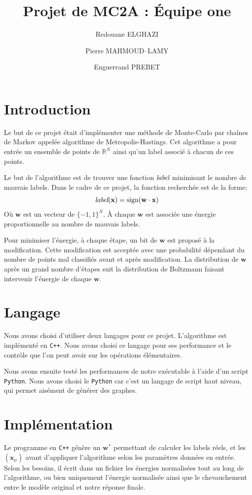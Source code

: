 \documentclass[twocolumn]{article}
\date{}
\author{Redouane ELGHAZI \and Pierre MAHMOUD--LAMY \and Enguerrand PREBET}
\title{Projet de MC2A : Équipe one}
\begin{document}
	\maketitle
	\section{Introduction}
		Le but de ce projet était d'implémenter une méthode de Monte-Carlo par chaînes de Markov appelée algorithme de Metropolis-Hastings. Cet algorithme a pour entrée un ensemble de points de $\mathbb{R}^N$ ainsi qu'un label associé à chacun de ces points.
		
		Le but de l'algorithme est de trouver une fonction $\emph{label}$ minimisant le nombre de mauvais labels. Dans le cadre de ce projet, la fonction recherchée est de la forme:
		$$\emph{label}(\mathbf{x}) = \text{sign}(\mathbf{w}\cdot \mathbf{x})$$
		Où $\mathbf{w}$ est un vecteur de $\big\{{-1},1\big\}^N$. À chaque $\mathbf{w}$ est associée une énergie proportionnelle au nombre de mauvais labels.
		
		Pour minimiser l'énergie, à chaque étape, un bit de $\mathbf{w}$ est proposé à la modification. Cette modification est acceptée avec une probabilité dépendant du nombre de points mal classifiés avant et après modification. La distribution de $\mathbf{w}$ après un grand nombre d'étapes suit la distribution de Boltzmann faisant intervenir l'énergie de chaque $\mathbf{w}$.
	\section{Langage}
		Nous avons choisi d'utiliser deux langages pour ce projet. L'algorithme est implémenté en \verb!C++!. Nous avons choisi ce langage pour ses performance et le contrôle que l'on peut avoir sur les opérations élémentaires.
		
		Nous avons ensuite testé les performances de notre exécutable à l'aide d'un script \verb!Python!. Nous avons choisi le \verb!Python! car c'est un langage de script haut niveau, qui permet aisément de générer des graphes.
		
	\section{Implémentation}
		Le programme en \verb!C++! génère un $\mathbf{w}^*$ permettant de calculer les labels réels, et les $(\mathbf{x}_\mu)$ avant d'appliquer l'algorithme selon les paramètres données en entrée. Selon les besoins, il écrit dans un fichier les énergies normalisées tout au long de l'algorithme, ou bien uniquement l'énergie normalisée ainsi que le chevauchement entre le modèle original et notre réponse finale.
		
\end{document}
